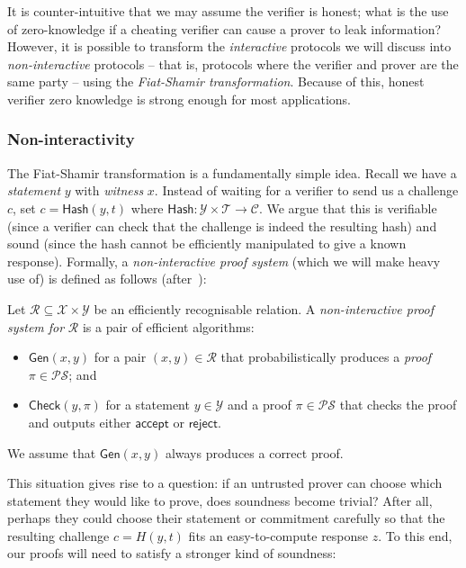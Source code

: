 \documentclass[12pt,a4paper]{article}
\theoremstyle{definition}
\newcounter{protocol}
\begin{document}
It is counter-intuitive that we may assume the verifier is honest; what is the use of zero-knowledge if a cheating verifier can cause a prover to leak information? However, it is possible to transform the \textit{interactive} protocols we will discuss into \textit{non-interactive} protocols -- that is, protocols where the verifier and prover are the same party -- using the \textit{Fiat-Shamir transformation}. Because of this, honest verifier zero knowledge is strong enough for most applications.

\subsubsection{Non-interactivity}
The Fiat-Shamir transformation is a fundamentally simple idea. Recall we have a \textit{statement} $y$ with \textit{witness} $x$. Instead of waiting for a verifier to send us a challenge $c$, set $c = \mathsf{Hash}(y, t)$ where $\mathsf{Hash}:\mathcal{Y}\times\mathcal{T}\rightarrow\mathcal{C}$. We argue that this is verifiable (since a verifier can check that the challenge is indeed the resulting hash) and sound (since the hash cannot be efficiently manipulated to give a known response). Formally, a \textit{non-interactive proof system} (which we will make heavy use of) is defined as follows (after~\cite{boneh2020graduate}):

\begin{definition}
    Let $\mathcal{R}\subseteq\mathcal{X}\times\mathcal{Y}$ be an efficiently recognisable relation. A \textit{non-interactive proof system for} $\mathcal{R}$ is a pair of efficient algorithms:
    \begin{itemize}
        \item $\mathsf{Gen}(x, y)$ for a pair $(x, y)\in\mathcal{R}$ that probabilistically produces a \textit{proof} $\pi\in\mathcal{PS}$; and
        \item $\mathsf{Check}(y, \pi)$ for a statement $y\in\mathcal{Y}$ and a proof $\pi\in\mathcal{PS}$ that checks the proof and outputs either $\mathsf{accept}$ or $\mathsf{reject}$.
    \end{itemize}
    We assume that $\mathsf{Gen}(x, y)$ always produces a correct proof.
\end{definition}
This situation gives rise to a question: if an untrusted prover can choose which statement they would like to prove, does soundness become trivial? After all, perhaps they could choose their statement or commitment carefully so that the resulting challenge $c = H(y, t)$ fits an easy-to-compute response $z$. To this end, our proofs will need to satisfy a stronger kind of soundness:
\end{document}
